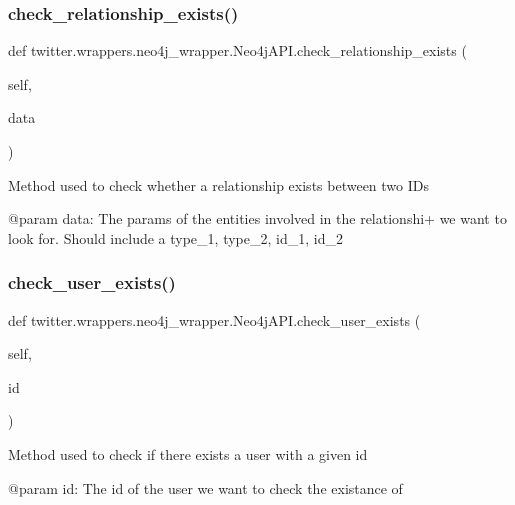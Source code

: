 \subsubsection{\texorpdfstring{check\+\_\+relationship\+\_\+exists()}{check\_relationship\_exists()}}
{\footnotesize\ttfamily def twitter.\+wrappers.\+neo4j\+\_\+wrapper.\+Neo4j\+A\+P\+I.\+check\+\_\+relationship\+\_\+exists (\begin{DoxyParamCaption}\item[{}]{self,  }\item[{}]{data }\end{DoxyParamCaption})}

\begin{DoxyVerb}Method used to check whether a relationship exists between two IDs

@param data: The params of the entities involved in the relationshi+ we want to look for. Should include
    a type_1, type_2, id_1, id_2
\end{DoxyVerb}
 \mbox{\label{classtwitter_1_1wrappers_1_1neo4j__wrapper_1_1Neo4jAPI_ab4ab706214e7d29521c47a40fe1e5b49}} 
\subsubsection{\texorpdfstring{check\+\_\+user\+\_\+exists()}{check\_user\_exists()}}
{\footnotesize\ttfamily def twitter.\+wrappers.\+neo4j\+\_\+wrapper.\+Neo4j\+A\+P\+I.\+check\+\_\+user\+\_\+exists (\begin{DoxyParamCaption}\item[{}]{self,  }\item[{}]{id }\end{DoxyParamCaption})}

\begin{DoxyVerb}Method used to check if there exists a user with a given id

@param id: The id of the user we want to check the existance of
\end{DoxyVerb}
 \mbox{\label{classtwitter_1_1wrappers_1_1neo4j__wrapper_1_1Neo4jAPI_a0995256fecdd24166fe3f8c0276a1124}} 
